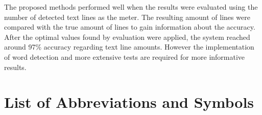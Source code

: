\documentclass{article}
\begin{document}
    The proposed methods performed well when the results were evaluated using the number of detected text lines as the meter. The resulting amount of lines were compared with the true amount of lines to gain information about the accuracy. After the optimal values found by evaluation were applied, the system reached around 97\% accuracy regarding text line amounts. However the implementation of word detection and more extensive tests are required for more informative results.

   \newpage
   \tableofcontents

   \newpage
   \section*{List of Abbreviations and Symbols}
\end{document}
